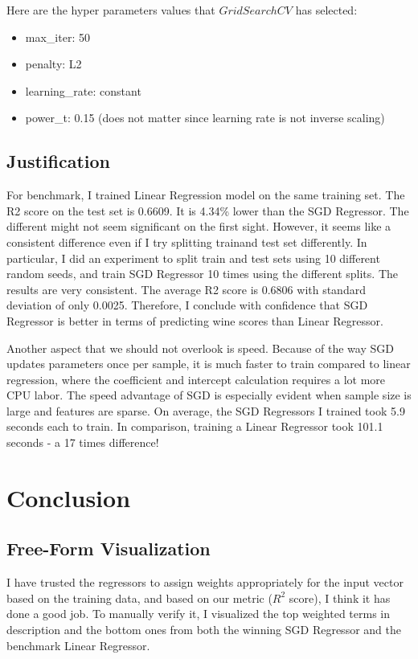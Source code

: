 \documentclass{article}
\begin{document}
Here are the hyper parameters values that $GridSearchCV$ has selected:
 \begin{itemize}
  \item max\_iter:
  50
  \item penalty:
  L2
  \item learning\_rate:
  constant
  \item power\_t:
  0.15 (does not matter since learning rate is not inverse scaling)
\end{itemize}

\subsection{Justification}
For benchmark, I trained Linear Regression model on the same training set. The R2 score on the test set is 0.6609. It is 4.34\% lower than the SGD Regressor. The different might not seem significant on the first sight. However, it seems like a consistent difference even if I try splitting trainand test set differently. In particular, I did an experiment to split train and test sets using 10 different random seeds, and train SGD Regressor 10 times using the different splits. The results are very consistent. The average R2 score is 0.6806 with standard deviation of only 0.0025. Therefore, I conclude with confidence that SGD Regressor is better in terms of predicting wine scores than Linear Regressor.

Another aspect that we should not overlook is speed. Because of the way SGD updates parameters once per sample, it is much faster to train compared to linear regression, where the coefficient and intercept calculation requires a lot more CPU labor. The speed advantage of SGD is especially evident when sample size is large and features are sparse. On average, the SGD Regressors I trained took 5.9 seconds each to train. In comparison, training a Linear Regressor took 101.1 seconds - a 17 times difference!

\section{Conclusion}
\subsection{Free-Form Visualization}
I have trusted the regressors to assign weights appropriately for the input vector based on the training data, and based on our metric ($R^2$ score), I think it has done a good job. To manually verify it, I visualized the top weighted terms in description and the bottom ones from both the winning SGD Regressor and the benchmark Linear Regressor.
\end{document}
